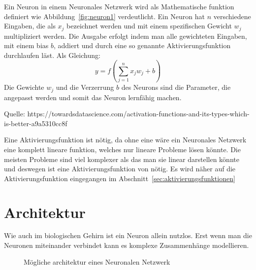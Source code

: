 \documentclass[12pt,a4paper]{report}
\begin{document}
Ein Neuron in einem Neuronales Netzwerk wird als Mathematische funktion definiert wie Abbildung~\ref{fig:neuron1}
verdeutlicht.
Ein Neuron hat $n$ verschiedene Eingaben, die als $x_j$ bezeichnet werden und mit einem spezifischen Gewicht $w_j$ multipliziert werden.
Die Ausgabe erfolgt indem man alle gewichteten Eingaben, mit einem bias $b$, addiert und durch eine so genannte
Aktivierungsfunktion durchlaufen läst.
Als Gleichung:
\[y =f\left(\sum_{j=1}^{n} x_j w_j + b\right)\]
Die Gewichte $w_j$ und die Verzerrung $b$ des Neurons sind die Parameter, die angepasst werden und somit das Neuron lernfähig machen.

Quelle: https://towardsdatascience.com/activation-functions-and-its-types-which-is-better-a9a5310cc8f

Eine Aktivierungsfunktion ist nötig, da ohne eine wäre ein Neuronales Netzwerk eine komplett lineare funktion, welches
nur lineare Probleme lösen könnte.
Die meisten Probleme sind viel komplexer als das man sie linear darstellen könnte und deswegen ist eine Aktivierungsfunktion von nötig.
Es wird näher auf die Aktivierungsfunktion eingegangen im Abschnitt~\ref{sec:aktivierungsfunktionen}

\section{Architektur}
Wie auch im biologischen Gehirn ist ein Neuron allein nutzlos.
Erst wenn man die Neuronen miteinander verbindet kann es komplexe Zusammenhänge modellieren.
\begin{figure}[h]
    \centering
{}
    \caption{Mögliche architektur eines Neuronalen Netzwerk}
    \label{fig:network1}
\end{figure}
\end{document}
